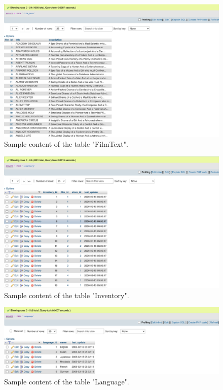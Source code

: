 \documentclass{article}
\begin{document}
		\begin{figure}[H]
			\includegraphics[width=\textwidth]{filmtext_content}
			\caption{Sample content of the table "Film\textunderscore Text".}
		\end{figure}
		\begin{figure}[H]
			\includegraphics[width=\textwidth]{inventory_content}
			\caption{Sample content of the table "Inventory".}
		\end{figure}
		\begin{figure}[H]
			\includegraphics[width=\textwidth]{language_content}
			\caption{Sample content of the table "Language".}
		\end{figure}
\end{document}
